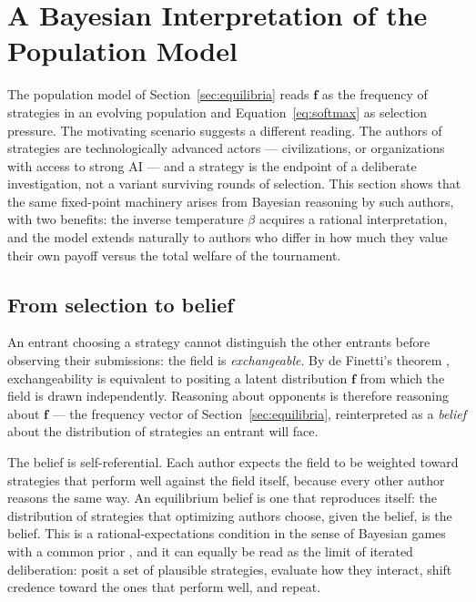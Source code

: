 \section{A Bayesian Interpretation of the Population Model}
\label{sec:bayesian}

The population model of Section~\ref{sec:equilibria} reads
$\mathbf{f}$ as the frequency of strategies in an evolving population
and Equation~\eqref{eq:softmax} as selection pressure.
The motivating scenario suggests a different reading.
The authors of strategies are technologically advanced actors ---
civilizations, or organizations with access to strong AI ---
and a strategy is the endpoint of a deliberate investigation,
not a variant surviving rounds of selection.
This section shows that the same fixed-point machinery arises from
Bayesian reasoning by such authors, with two benefits:
the inverse temperature $\beta$ acquires a rational interpretation,
and the model extends naturally to authors who differ in how much
they value their own payoff versus the total welfare of the
tournament.

\subsection{From selection to belief}

An entrant choosing a strategy cannot distinguish the other entrants
before observing their submissions: the field is \emph{exchangeable}.
By de Finetti's theorem \citep{definetti1937prevision}, exchangeability
is equivalent to positing a latent distribution $\mathbf{f}$ from which
the field is drawn independently.
Reasoning about opponents is therefore reasoning about $\mathbf{f}$ ---
the frequency vector of Section~\ref{sec:equilibria}, reinterpreted as
a \emph{belief} about the distribution of strategies an entrant will face.

The belief is self-referential.
Each author expects the field to be weighted toward strategies that
perform well against the field itself, because every other author
reasons the same way.
An equilibrium belief is one that reproduces itself:
the distribution of strategies that optimizing authors choose,
given the belief, is the belief.
This is a rational-expectations condition in the sense of
Bayesian games with a common prior \citep{harsanyi1967games},
and it can equally be read as the limit of iterated deliberation:
posit a set of plausible strategies, evaluate how they interact,
shift credence toward the ones that perform well, and repeat.

